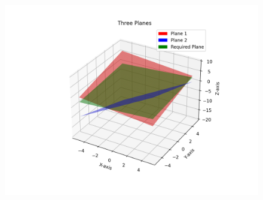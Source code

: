 \documentclass[journal]{IEEEtran}
\begin{document}
\begin{figure}[H]
    \centering
    \includegraphics[width=\columnwidth]{figs/Figure.png}
    \caption{}
    \label{fig:placeholder}
\end{figure}
\end{document}
